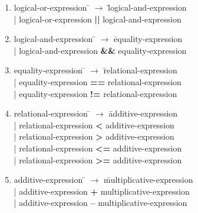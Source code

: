 \begin{enumerate}
\item \begin{tabbing} logical-or-expression \= $\rightarrow$ \= logical-and-expression \\
	\> \hspace*{0.05cm} | \> logical-or-expression \textbf{||} logical-and-expression \\
\end{tabbing}

\item \begin{tabbing} logical-and-expression \= $\rightarrow$ \= equality-expression \\
	\> \hspace*{0.05cm} | \> logical-and-expression \textbf{\&\&} equality-expression \\
\end{tabbing}

\item \begin{tabbing} equality-expression \= $\rightarrow$ \= relational-expression \\
	\> \hspace*{0.05cm} | \> equality-expression \textbf{==} relational-expression \\
	\> \hspace*{0.05cm} | \> equality-expression \textbf{!=} relational-expression \\
\end{tabbing}

\item \begin{tabbing} relational-expression \= $\rightarrow$ \= additive-expression \\
	\> \hspace*{0.05cm} | \> relational-expression \textbf{<}   additive-expression \\
	\> \hspace*{0.05cm} | \> relational-expression \textbf{>}   additive-expression \\
	\> \hspace*{0.05cm} | \> relational-expression \textbf{<=} additive-expression \\
	\> \hspace*{0.05cm} | \> relational-expression \textbf{>=} additive-expression \\
\end{tabbing}

\item \begin{tabbing} additive-expression \= $\rightarrow$ \= multiplicative-expression \\
	\> \hspace*{0.05cm} | \> additive-expression \textbf{+} multiplicative-expression \\
	\> \hspace*{0.05cm} | \> additive-expression \textbf{--} multiplicative-expression \\
\end{tabbing}


\end{enumerate}
